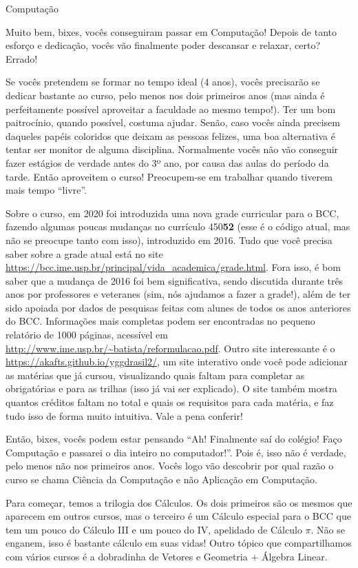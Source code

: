 \begin{subsecao}{Computação}

Muito bem, bixes, vocês conseguiram passar em Computação! Depois de tanto
esforço e dedicação, vocês vão finalmente poder descansar e relaxar, certo?
Errado!

Se vocês pretendem se formar no tempo ideal (4 anos), vocês precisarão se
dedicar bastante ao curso, pelo menos nos dois primeiros anos (mas ainda é
perfeitamente possível aproveitar a faculdade ao mesmo tempo!). Ter um bom
paitrocínio, quando possível, costuma ajudar. Senão, caso vocês ainda precisem
daqueles papéis coloridos que deixam as pessoas felizes, uma boa alternativa é
tentar ser monitor de alguma disciplina. Normalmente vocês não vão conseguir 
fazer estágios de verdade antes do 3º ano, por causa das aulas do período da tarde. 
Então aproveitem o curso! Preocupem-se em trabalhar quando tiverem mais tempo ``livre''.

Sobre o curso, em 2020 foi introduzida uma nova grade curricular para o BCC,
fazendo algumas poucas mudanças no currículo 450\textbf{52} (esse é o código
atual, mas não se preocupe tanto com isso), introduzido em 2016. Tudo que você
precisa saber sobre a grade atual está no site
\url{https://bcc.ime.usp.br/principal/vida\_academica/grade.html}.
Fora isso, é bom saber que a mudança de 2016 foi bem significativa, sendo
discutida durante três anos por professores e veteranes (sim, nós ajudamos a
fazer a grade!), além de ter sido apoiada por dados de pesquisas feitas com
alunes de todos os anos anteriores do BCC. Informações mais completas podem
ser encontradas no pequeno relatório de 1000 páginas, acessível em
\url{http://www.ime.usp.br/~batista/reformulacao.pdf}. Outro site interessante é o 
\url{https://akafts.github.io/yggdrasil2/}, um
site interativo onde você pode adicionar as matérias que já cursou,
visualizando quais faltam para completar as obrigatórias e para as trilhas
(isso já vai ser explicado). O site também mostra quantos créditos faltam no
total e quais os requisitos para cada matéria, e faz tudo isso de forma muito
intuitiva. Vale a pena conferir!

Então, bixes, vocês podem estar pensando ``Ah! Finalmente saí do colégio! Faço
Computação e passarei o dia inteiro no computador!''. Pois é, isso não é
verdade, pelo menos não nos primeiros anos. Vocês logo vão descobrir por qual
razão o curso se chama Ciência da Computação e não Aplicação em Computação.

Para começar, temos a trilogia dos Cálculos. Os dois primeiros são os mesmos
que aparecem em outros cursos, mas o terceiro é um Cálculo especial para o BCC
que tem um pouco do Cálculo III e um pouco do IV, apelidado de Cálculo $\pi$.
Não se enganem, isso é bastante cálculo em suas vidas! Outro tópico que
compartilhamos com vários cursos é a dobradinha de Vetores e Geometria $+$
Álgebra Linear. 


\end{subsecao}
